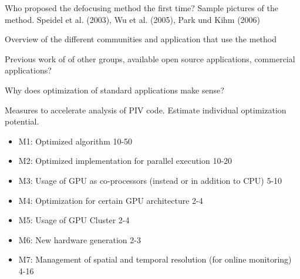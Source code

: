 
Who proposed the defocusing method the first time? Sample pictures of the method. 
Speidel et al. (2003), Wu et al. (2005), Park und Kihm (2006)


Overview of the different communities and application that use the method


Previous work of of other groups, available open source applications, commercial applications?

Why does optimization of standard applications make sense?


Measures to accelerate analysis of PIV code. Estimate individual optimization potential. 
\begin{itemize}
\item M1: Optimized algorithm 10-50
\item M2: Optimized implementation for parallel execution 10-20
\item M3: Usage of GPU as co-processors (instead or in addition to CPU) 5-10
\item M4: Optimization for certain GPU architecture 2-4
\item M5: Usage of GPU Cluster 2-4
\item M6: New hardware generation 2-3
\item M7: Management of spatial and temporal resolution (for online monitoring) 4-16
\end{itemize}



